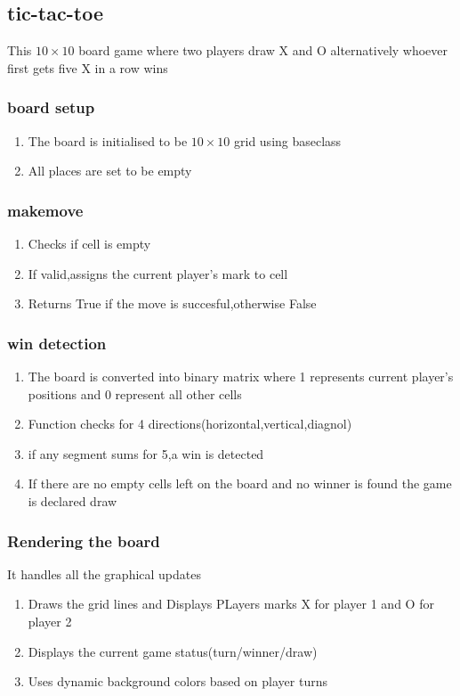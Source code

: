 \documentclass{article}
\begin{document}
\subsection{tic-tac-toe}
This $10 \times 10$ board game where two players draw X and O alternatively whoever first gets five X in a row wins
\subsubsection{board setup}
\begin{enumerate}
    \item The board is initialised to be $10 \times 10$ grid using baseclass
    \item All places are set to be empty
\end{enumerate}
\subsubsection{makemove}
\begin{enumerate}
    \item Checks if cell is empty
    \item If valid,assigns the current player's mark to cell
    \item Returns True if the move is succesful,otherwise False
\end{enumerate}
\subsubsection{win detection}
\begin{enumerate}
    \item The board is converted into binary matrix where 1 represents current player's positions and 0 represent all other cells
    \item Function checks for 4 directions(horizontal,vertical,diagnol)
    \item if any segment sums for 5,a win is detected
    \item If there are no empty cells left on the board and no winner is found the game is declared draw
\end{enumerate}
\subsubsection{Rendering the board}
It handles all the graphical updates
\begin{enumerate}
    \item Draws the grid lines and Displays PLayers marks X for player 1 and O for player 2
    \item Displays the current game status(turn/winner/draw)
    \item Uses dynamic background colors based on player turns 
\end{enumerate}
\end{document}
